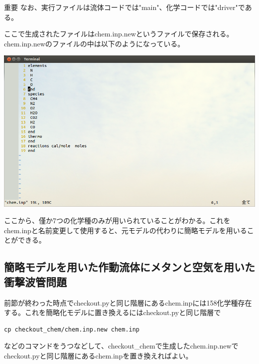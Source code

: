 \documentclass{jsarticle}
\begin{document}
\begin{itembox}[l]{重要}
なお、実行ファイルは流体コードでは"main"、化学コードでは"driver"である。
\end{itembox}

ここで生成されたファイルはchem.inp.newというファイルで保存される。chem.inp.newのファイルの中は以下のようになっている。
\begin{center}
\includegraphics[width=.8\textwidth,bb=0 0 962 577]{tutorial_img/120.png}
\end{center}
ここから、僅か7つの化学種のみが用いられていることがわかる。これをchem.inpと名前変更して使用すると、元モデルの代わりに簡略モデルを用いることができる。
\subsection{簡略モデルを用いた作動流体にメタンと空気を用いた衝撃波管問題}%
前節が終わった時点でcheckout.pyと同じ階層にあるchem.inpには158化学種存在する。これを簡略化モデルに置き換えるにはcheckout.pyと同じ階層で
\begin{verbatim}
cp checkout_chem/chem.inp.new chem.inp
\end{verbatim}
などのコマンドをうつなどして、checkout\_chemで生成したchem.inp.newでcheckout.pyと同じ階層にあるchem.inpを置き換えればよい。
\end{document}
